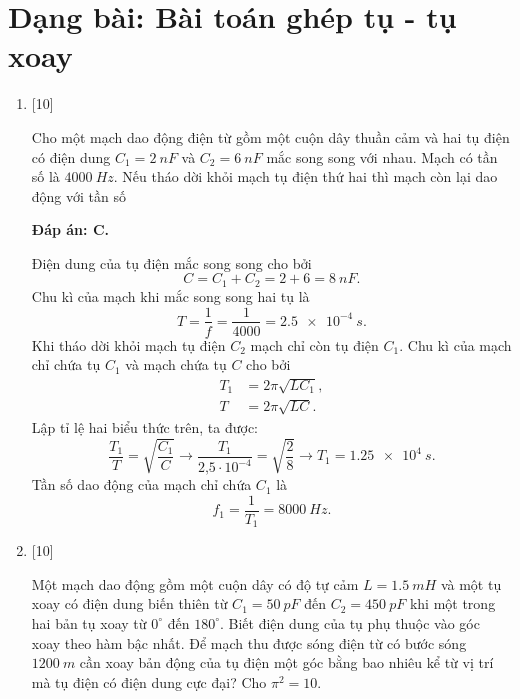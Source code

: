 \section{Dạng bài: Bài toán ghép tụ - tụ xoay}
\begin{enumerate}[label=\bfseries Câu \arabic*:]

	\item {} [10]
	
	\cauhoi
	{Cho một mạch dao động điện từ gồm một cuộn dây thuần cảm và hai tụ điện có điện dung $C_1 = \SI{2}{nF}$ và $C_2 = \SI{6}{nF}$ mắc song song với nhau. Mạch có tần số là $\SI{4000}{Hz}$. Nếu  tháo dời khỏi mạch tụ điện thứ hai thì mạch còn lại dao động với tần số
	}
	
	\loigiai
	{		\textbf{Đáp án: C.}
		
Điện dung của tụ điện mắc song song cho bởi
$$
C=C_{1}+C_{2}=2+6= \SI{8}{nF}.
$$
Chu kì của mạch khi mắc song song hai tụ là
$$
T=\dfrac{1}{f}=\dfrac{1}{4000}= \SI{2,5 e-4}{s}.
$$
Khi tháo dời khỏi mạch tụ điện $C_{2}$ mạch chỉ còn tụ điện $C_{1}$. Chu kì của mạch chỉ chứa tụ $C_{1}$ và mạch chứa tụ $C$ cho bởi
$$
\begin{aligned}
T_{1} &=2 \pi \sqrt{L C_{1}}, \\
T &=2 \pi \sqrt{L C}.
\end{aligned}
$$
Lập tỉ lệ hai biểu thức trên, ta được:
$$
\dfrac{T_{1}}{T}=\sqrt{\dfrac{C_{1}}{C}} \rightarrow \dfrac{T_{1}}{\text{2,5} \cdot 10^{-4}}=\sqrt{\dfrac{2}{8}} \rightarrow T_{1}= \SI{1,25 e4}{s}.
$$
Tần số dao động của mạch chỉ chứa $C_{1}$ là
$$
f_{1}=\dfrac{1}{T_{1}}= \SI{8000}{Hz}.
$$	
	}


	\item {} [10]
	
	\cauhoi
	{Một mạch dao động gồm một cuộn dây có độ tự cảm $L = \SI{1,5}{mH}$ và một tụ xoay có điện dung biến thiên từ $C_1 = \SI{50}{pF}$ đến $C_2 = \SI{450}{pF}$ khi một trong hai bản tụ xoay từ $0^\circ$ đến $180^\circ$. Biết điện dung của tụ phụ thuộc vào góc xoay theo hàm bậc nhất. Để mạch thu được sóng điện từ có bước sóng $\SI{1200}{m}$ cần xoay bản động của tụ điện một góc bằng bao nhiêu kể từ vị trí mà tụ điện có điện dung cực đại? Cho $\pi^2 = 10$.
	}


\end{enumerate}
